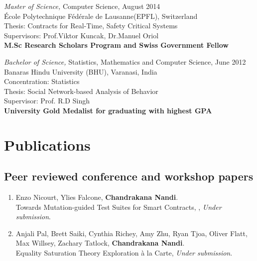 \documentclass[margin, 10pt]{res} %
\begin{document}
\begin{resume}
{\sl Master of Science,} Computer Science, August 2014 \\
\'{E}cole Polytechnique F\'{e}d\'{e}rale de Lausanne(EPFL), Switzerland \\
Thesis: Contracts for Real-Time, Safety Critical Systems \\Supervisors: Prof.Viktor Kuncak, Dr.Manuel Oriol\\
\textbf{M.Sc Research Scholars Program and Swiss Government Fellow}

{\sl Bachelor of Science,} Statistics, Mathematics and Computer Science, June 2012 \\
Banaras Hindu University (BHU), Varanasi, India \\
Concentration: Statistics \\
Thesis: Social Network-based Analysis of Behavior \\ Supervisor: Prof. R.D Singh\\
\textbf{University Gold Medalist for graduating with highest GPA}

\section{Publications}
\subsection{Peer reviewed conference and workshop papers}


\begin{enumerate}
  \item Enzo Nicourt, Ylies Falcone, \textbf{Chandrakana Nandi}. \\
    Towards Mutation-guided Test Suites for Smart Contracts, , \textit{Under submission}.

  \item Anjali Pal, Brett Saiki, Cynthia Richey, Amy Zhu, Ryan Tjoa, Oliver Flatt, Max Willsey, Zachary Tatlock, \textbf{Chandrakana Nandi}. \\
    Equality Saturation Theory Exploration à la Carte, \textit{Under submission}.


\end{enumerate}
\end{resume}
\end{document}
